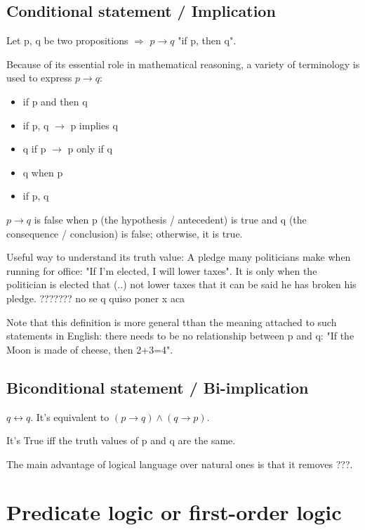 \documentclass[12pt, a4paper]{book}
\begin{document}
\subsection*{Conditional statement / Implication}

Let p, q be two propositions $\Rightarrow$ $p \rightarrow q $ "if p, then q".

Because of its essential role in mathematical reasoning, a variety of terminology is used to express $p \rightarrow q$:

\begin{itemize}
    \item if p and then q
    \item if p, q $\rightarrow$ p implies q
    \item q if p $\rightarrow$ p only if q
    \item q when p
    \item if p, q
\end{itemize}

$p \rightarrow q$ is false when p (the hypothesis / antecedent) is true and q (the consequence / conclusion) is false; otherwise, it is true.

Useful way to understand its truth value: A pledge many politicians make when running for office: "If I'm elected, I will lower taxes".
It is only when the politician is elected that (..) not lower taxes that it can be said he has broken his pledge. ??????? no se q quiso poner x aca

\begin{rem}
    Note that this definition is more general tthan the meaning attached to such statements in English: there needs to be no relationship between p and q: "If the Moon is made of cheese, then 2+3=4".
\end{rem}

\subsection*{Biconditional statement / Bi-implication}

$q \leftrightarrow q$. It's equivalent to $(p \rightarrow q) \wedge (q \rightarrow p)$. 

It's True iff the truth values of p and q are the same.

The main advantage of logical language over natural ones is that it removes ???.

\section*{Predicate logic or first-order logic}
\end{document}
